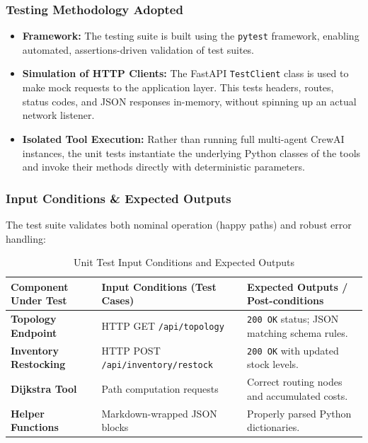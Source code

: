 \subsubsection{Testing Methodology Adopted}
\begin{itemize}
    \item \textbf{Framework:} The testing suite is built using the \texttt{pytest} framework, enabling automated, assertions-driven validation of test suites.
    \item \textbf{Simulation of HTTP Clients:} The FastAPI \texttt{TestClient} class is used to make mock requests to the application layer. This tests headers, routes, status codes, and JSON responses in-memory, without spinning up an actual network listener.
    \item \textbf{Isolated Tool Execution:} Rather than running full multi-agent CrewAI instances, the unit tests instantiate the underlying Python classes of the tools and invoke their methods directly with deterministic parameters.
\end{itemize}

\subsubsection{Input Conditions \& Expected Outputs}
The test suite validates both nominal operation (happy paths) and robust error handling:

\begin{table}[H]
    \centering
    \renewcommand{\arraystretch}{1.3}
    \begin{tabularx}{\textwidth}{|l|X|X|}
    \hline
    \textbf{Component Under Test} & \textbf{Input Conditions (Test Cases)} & \textbf{Expected Outputs / Post-conditions} \\ \hline
    \textbf{Topology Endpoint} & HTTP GET \texttt{/api/topology} & \texttt{200 OK} status; JSON matching schema rules. \\ \hline
    \textbf{Inventory Restocking} & HTTP POST \texttt{/api/inventory/restock} & \texttt{200 OK} with updated stock levels. \\ \hline
    \textbf{Dijkstra Tool} & Path computation requests & Correct routing nodes and accumulated costs. \\ \hline
    \textbf{Helper Functions} & Markdown-wrapped JSON blocks & Properly parsed Python dictionaries. \\ \hline
    \end{tabularx}
    \caption{Unit Test Input Conditions and Expected Outputs}
    \label{tab:unit_tests}
\end{table}

